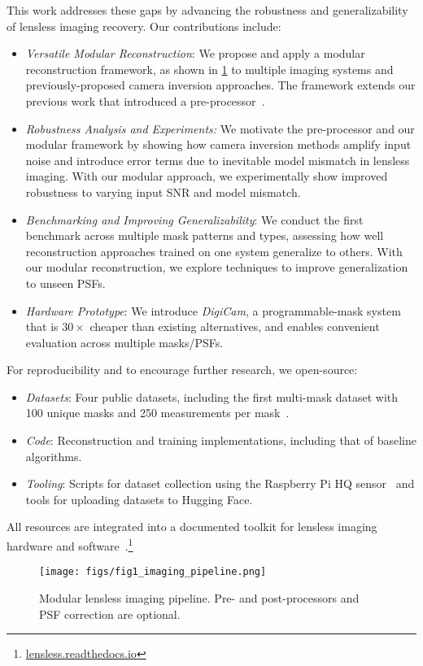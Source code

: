 This work addresses these gaps by advancing the robustness and generalizability of lensless imaging recovery. Our contributions include:
\begin{itemize}
    \item \textit{Versatile Modular Reconstruction}: We propose and apply a modular reconstruction framework, as shown in \cref{fig:pipeline} to multiple imaging systems and previously-proposed camera inversion approaches. The framework extends our previous work that introduced a pre-processor~\cite{Perron2023}.
\item \textit{Robustness Analysis and Experiments:} We motivate the pre-processor and our modular framework by showing how camera inversion methods amplify input noise and introduce error terms due to inevitable model mismatch in lensless imaging. With our modular approach, we experimentally show improved robustness to varying input SNR and model mismatch.
    \item \textit{Benchmarking and Improving Generalizability}: We conduct the first benchmark across multiple mask patterns and types, assessing how well reconstruction approaches trained on one system generalize to others. With our modular reconstruction, we explore techniques to improve
    generalization to unseen PSFs.
    \item \textit{Hardware Prototype}: We introduce \textit{DigiCam}, a programmable-mask system that is $30\times$ cheaper than existing alternatives, and enables convenient evaluation across multiple masks/PSFs.
\end{itemize}
For reproducibility and to encourage further research, we open-source:
\begin{itemize}
    \item \textit{Datasets}: Four public datasets, including the first multi-mask dataset with 100 unique masks and 250 measurements per mask~\cite{tapecam,digicam_celeba,digicam_single,digicam_multi}.
    \item \textit{Code}: Reconstruction and training implementations, including that of baseline algorithms.
    \item \textit{Tooling}: Scripts for dataset collection using the Raspberry Pi HQ sensor~\cite{rpi_hq} and tools for uploading datasets to Hugging Face.
\end{itemize}
All resources are integrated into a documented toolkit for lensless imaging hardware and software~\cite{Bezzam2023}.\footnote{\href{https://lensless.readthedocs.io}{lensless.readthedocs.io}}

\begin{figure}[t!]
    \centering
\texttt{[image: figs/fig1\_imaging\_pipeline.png]}
\caption{Modular lensless imaging pipeline. Pre- and post-processors and PSF correction are optional.}
  \label{fig:pipeline}
\end{figure}

